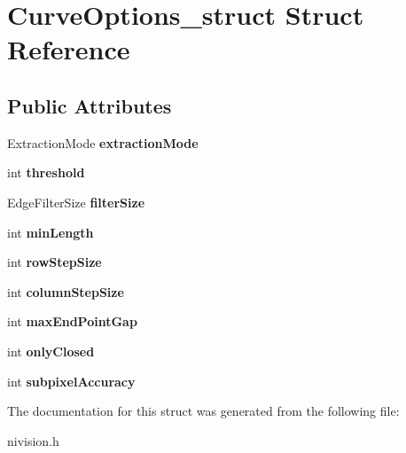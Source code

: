 \hypertarget{structCurveOptions__struct}{
\section{CurveOptions\_\-struct Struct Reference}
\label{structCurveOptions__struct}
}
\subsection*{Public Attributes}
\begin{DoxyCompactItemize}
\item 
\hypertarget{structCurveOptions__struct_a39376e85201b336a3a59210fba245be1}{
ExtractionMode {\bfseries extractionMode}}
\label{structCurveOptions__struct_a39376e85201b336a3a59210fba245be1}

\item 
\hypertarget{structCurveOptions__struct_afa578a07d3513cef404480915a4a9755}{
int {\bfseries threshold}}
\label{structCurveOptions__struct_afa578a07d3513cef404480915a4a9755}

\item 
\hypertarget{structCurveOptions__struct_a0939696a7df263bd168b59a6fbefa329}{
EdgeFilterSize {\bfseries filterSize}}
\label{structCurveOptions__struct_a0939696a7df263bd168b59a6fbefa329}

\item 
\hypertarget{structCurveOptions__struct_a8dc2326d107e295de4f724aba1e00cdb}{
int {\bfseries minLength}}
\label{structCurveOptions__struct_a8dc2326d107e295de4f724aba1e00cdb}

\item 
\hypertarget{structCurveOptions__struct_a9f5516501ff02c20254ad2070ccedc2c}{
int {\bfseries rowStepSize}}
\label{structCurveOptions__struct_a9f5516501ff02c20254ad2070ccedc2c}

\item 
\hypertarget{structCurveOptions__struct_a21fe2c9c94c4bdd5933eb6ef660996f8}{
int {\bfseries columnStepSize}}
\label{structCurveOptions__struct_a21fe2c9c94c4bdd5933eb6ef660996f8}

\item 
\hypertarget{structCurveOptions__struct_a1093624a04b69be9f2ea7d0175fe8146}{
int {\bfseries maxEndPointGap}}
\label{structCurveOptions__struct_a1093624a04b69be9f2ea7d0175fe8146}

\item 
\hypertarget{structCurveOptions__struct_a89836fc36f1ec644bd054cafcd363a7a}{
int {\bfseries onlyClosed}}
\label{structCurveOptions__struct_a89836fc36f1ec644bd054cafcd363a7a}

\item 
\hypertarget{structCurveOptions__struct_aecfc6e953ab0a6541ebd98f860607f9a}{
int {\bfseries subpixelAccuracy}}
\label{structCurveOptions__struct_aecfc6e953ab0a6541ebd98f860607f9a}

\end{DoxyCompactItemize}


The documentation for this struct was generated from the following file:\begin{DoxyCompactItemize}
\item 
nivision.h\end{DoxyCompactItemize}
